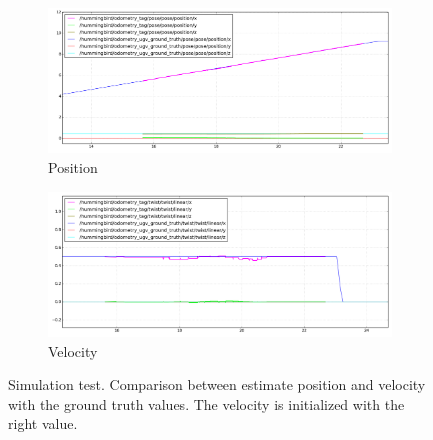 \begin{figure}[!htbp]
  \centering
   \begin{subfigure}[b]{0.45\textwidth}
        \includegraphics[width=\textwidth]{img/position_simulation_hot_init.png}
        \caption{Position }
        \label{fig:one}
   \end{subfigure}\hfill
   \begin{subfigure}[b]{0.45\textwidth}
        \includegraphics[width=\textwidth]{img/velocity_simulation_hot_init.png}
        \caption{Velocity}
        \label{fig:two}
   \end{subfigure}
  \caption{Simulation test. Comparison between estimate position and velocity with the ground truth values. The velocity is initialized with the right value.}
  \label{fig:ekf_simulation_hot_init}
\end{figure} 

